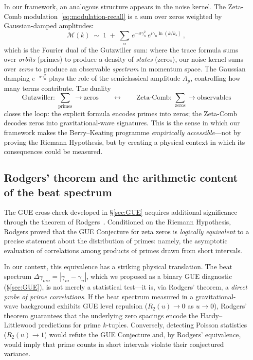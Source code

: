 \documentclass[12pt,a4paper]{article}
\begin{document}
In our framework, an analogous structure appears in the
noise kernel.
The Zeta-Comb modulation~\eqref{eq:modulation-recall} is a
sum over zeros weighted by Gaussian-damped amplitudes:
%
\begin{equation}
  \mathcal{M}(k)
  \;\sim\;
  1 \;+\;
  \sum_{n}\,e^{-\sigma\gamma_{n}^{2}}\,
  e^{i\gamma_{n}\ln(k/k_{\star})}\,,
  \label{eq:noise-trace}
\end{equation}
%
which is the Fourier dual of the Gutzwiller sum: where the
trace formula sums over \emph{orbits} (primes) to produce a
density of \emph{states} (zeros), our noise kernel sums over
\emph{zeros} to produce an observable \emph{spectrum} in
momentum space.
The Gaussian damping $e^{-\sigma\gamma_{n}^{2}}$ plays the
role of the semiclassical amplitude $A_{p}$, controlling how
many terms contribute.
The duality
%
\begin{equation}
  \text{Gutzwiller: }
  \sum_{\text{primes}} \to \text{zeros}
  \qquad\longleftrightarrow\qquad
  \text{Zeta-Comb: }
  \sum_{\text{zeros}} \to \text{observables}
  \label{eq:duality}
\end{equation}
%
closes the loop: the explicit formula encodes primes into zeros;
the Zeta-Comb decodes zeros into gravitational-wave signatures.
This is the sense in which our framework makes the
Berry--Keating programme \emph{empirically accessible}---not
by proving the Riemann Hypothesis, but by creating a physical
context in which its consequences could be measured.


\subsection{Rodgers' theorem and the arithmetic content of the
            beat spectrum}
\label{subsec:rodgers-arithmetic}

The GUE cross-check developed in \S\ref{sec:GUE} acquires
additional significance through the theorem of
Rodgers~\cite{Rodgers2018,Rodgers2024MMJ}.
Conditioned on the Riemann Hypothesis, Rodgers proved that the
GUE Conjecture for zeta zeros is \emph{logically equivalent} to
a precise statement about the distribution of primes: namely,
the asymptotic evaluation of correlations among products of
primes drawn from short intervals.

In our context, this equivalence has a striking physical
translation.
The beat spectrum $\Delta\gamma_{mn} = |\gamma_{m}-\gamma_{n}|$,
which we proposed as a binary GUE diagnostic
(\S\ref{sec:GUE}), is not merely a statistical test---it is,
via Rodgers' theorem, a \emph{direct probe of prime
correlations}.
If the beat spectrum measured in a gravitational-wave
background exhibits GUE level repulsion ($R_{2}(u) \to 0$ as
$u \to 0$), Rodgers' theorem guarantees that the underlying
zero spacings encode the Hardy--Littlewood predictions for
prime $k$-tuples.
Conversely, detecting Poisson statistics ($R_{2}(u) \to 1$)
would refute the GUE Conjecture and, by Rodgers' equivalence,
would imply that prime counts in short intervals violate
their conjectured variance.
\end{document}
